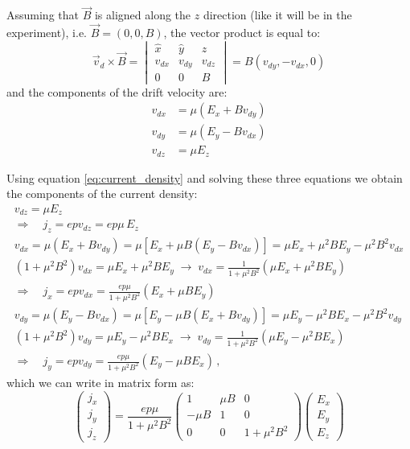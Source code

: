 \documentclass[11pt,a4paper]{article}
\begin{document}
Assuming that $\vec{B}$ is aligned along the $z$ direction (like it will be in the experiment), i.e. $\vec{B}=(0,0,B)$, the vector product is equal to:
\begin{equation*}
\vec{v}_d\times\vec{B}=
\begin{vmatrix}
\hat{x} & \hat{y} & \hat{z} \\
v_{dx} & v_{dy} & v_{dz} \\
0 & 0 & B
\end{vmatrix}=B\left(v_{dy}, -v_{dx}, 0\right)
\end{equation*}
and the components of the drift velocity are:
\begin{align}\nonumber
v_{dx} &= \mu\left(E_x+Bv_{dy}\right)\\ \label{eq:drift_velocity_components}
v_{dy} &= \mu\left(E_y - Bv_{dx}\right)\\\nonumber
v_{dz} &= \mu E_z
\end{align}

Using equation \eqref{eq:current_density} and solving these three equations we obtain the components of the current density:
\begin{gather*}
v_{dz} = \mu E_z\\
\Rightarrow\quad j_z=epv_{dz}=ep\mu\,E_z\\
v_{dx} = \mu\left(E_x + B v_{dy}\right)=\mu\left[E_x+\mu B\left(E_y-Bv_{dx}\right)\right]=\mu E_x+\mu^2BE_y-\mu^2B^2v_{dx}\\
\left(1+\mu^2B^2\right)v_{dx}=\mu E_x+\mu^2BE_y\;\rightarrow\;v_{dx}=\frac{1}{1+\mu^2B^2}\left(\mu E_x+\mu^2BE_y\right)\\
\Rightarrow\quad j_x=epv_{dx}=\frac{ep\mu}{1+\mu^2B^2}\left(E_x + \mu BE_y\right)\\
v_{dy} = \mu\left(E_y - B v_{dx}\right)=\mu\left[E_y - \mu B\left(E_x + Bv_{dy}\right)\right]=\mu E_y - \mu^2BE_x - \mu^2B^2v_{dy}\\
\left(1+\mu^2B^2\right)v_{dy}=\mu E_y-\mu^2BE_x\;\rightarrow\;v_{dy}=\frac{1}{1+\mu^2B^2}\left(\mu E_y -\mu^2B E_x\right)\\
\Rightarrow\quad j_y=epv_{dy}=\frac{ep\mu}{1+\mu^2B^2}\left(E_y - \mu BE_x\right)\,,
\end{gather*}
which we can write in matrix form as:
\begin{equation}\label{eq:current_density_components}
\begin{pmatrix}
j_x \\ j_y \\ j_z
\end{pmatrix}=
\frac{ep\mu}{1+\mu^2B^2}
\begin{pmatrix}
1 & \mu B & 0 \\
-\mu B & 1 & 0 \\
0 & 0 & 1+\mu^2B^2
\end{pmatrix}
\begin{pmatrix}
E_x \\ E_y \\ E_z
\end{pmatrix}
\end{equation}
\end{document}
